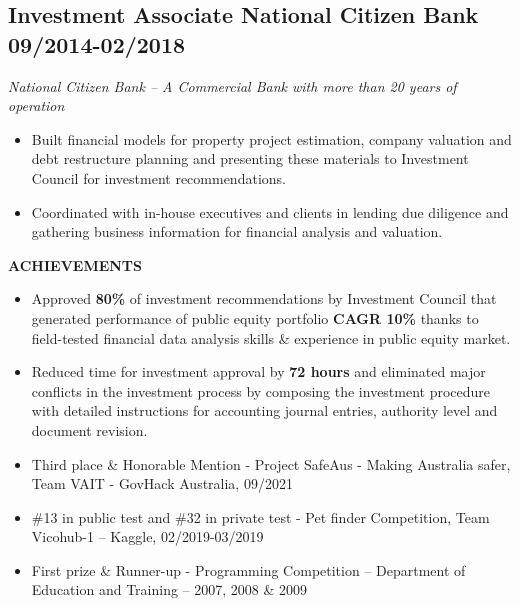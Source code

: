 \documentclass[11pt,a4paper]{article}
\newcommand{\linesection}[1]{%
  \vspace{10pt}%
  \noindent{\color{headerblue}\large\bfseries #1}\hspace{0.5em}{\color{sectionline}\leavevmode\leaders\hrule height 1.5pt\hfill\kern0pt}%
  \par\vspace{8pt}%
}
\begin{document}
\begin{mdframed}[style=dashedleft]
\vspace{4pt}

\subsection*{Investment Associate \hfill \textbf{National Citizen Bank} \hfill 09/2014-02/2018}
\textit{National Citizen Bank -- A Commercial Bank with more than 20 years of operation}

\begin{itemize}[leftmargin=1.5em, itemsep=4pt]
    \item Built financial models for property project estimation, company valuation and debt restructure planning and presenting these materials to Investment Council for investment recommendations.
    \item Coordinated with in-house executives and clients in lending due diligence and gathering business information for financial analysis and valuation.
\end{itemize}

\textbf{ACHIEVEMENTS}
\begin{itemize}[leftmargin=1.5em, itemsep=4pt]
    \item Approved \textbf{80\%} of investment recommendations by Investment Council that generated performance of public equity portfolio \textbf{CAGR 10\%} thanks to field-tested financial data analysis skills \& experience in public equity market.
    \item Reduced time for investment approval by \textbf{72 hours} and eliminated major conflicts in the investment process by composing the investment procedure with detailed instructions for accounting journal entries, authority level and document revision.
\end{itemize}

\end{mdframed}

\vspace{6pt}

\linesection{HONORS \& AWARDS}
\begin{mdframed}[style=dashedleft]
\begin{itemize}[leftmargin=1.5em, itemsep=4pt]
    \item Third place \& Honorable Mention - Project SafeAus - Making Australia safer, Team VAIT - GovHack Australia, 09/2021
    \item \#13 in public test and \#32 in private test - Pet finder Competition, Team Vicohub-1 -- Kaggle, 02/2019-03/2019
    \item First prize \& Runner-up - Programming Competition -- Department of Education and Training -- 2007, 2008 \& 2009
\end{itemize}
\end{mdframed}
\end{document}

